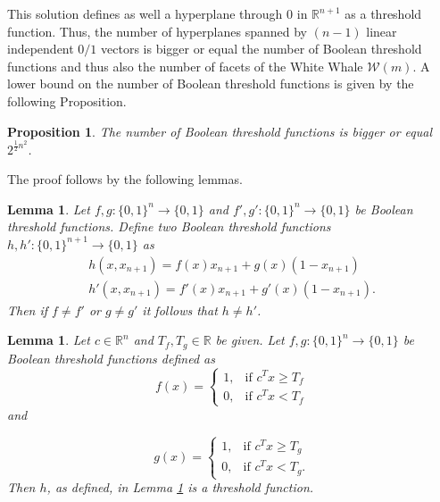 \documentclass[11pt]{amsart}
\newtheorem{prop}[theorem]{Proposition}
\newtheorem{lem}[theorem]{Lemma}
\theoremstyle{definition}
\theoremstyle{definition}
\theoremstyle{question}
\newcommand\WW{\mathcal{W}}
\begin{document}
This solution defines as well a hyperplane through $0$ in $\mathbb{R}^{n+1}$ as a threshold function.  Thus, the number of hyperplanes spanned by $(n-1)$ linear independent $0/1$ vectors is bigger or equal the number of Boolean threshold functions and thus also the number of facets of the White Whale $\WW(m)$. A lower bound on the number of Boolean threshold functions is given by the following Proposition. 

\begin{prop}
The number of Boolean threshold functions is bigger or equal $2^{\frac{1}{2}n^2}$. 
\end{prop}

The proof follows by the following lemmas.

\begin{lem} \label{lem1}
Let $f,g \colon \{0,1 \}^n \rightarrow \{0,1 \}$ and $f',g' \colon \{0,1 \}^n \rightarrow \{0,1 \}$ be Boolean threshold functions. Define two Boolean threshold functions $h,h' \colon \{0,1 \}^{n+1} \rightarrow \{0,1 \}$ as 
\begin{align*}
    h(x,x_{n+1}) = f(x)x_{n+1} + g(x)(1-x_{n+1}) \\
    h'(x,x_{n+1}) = f'(x)x_{n+1} + g'(x)(1-x_{n+1}).
\end{align*}
Then if $f\neq f' $ or $g \neq g'$ it follows that $h \neq h'$. 
\end{lem}

\begin{lem} \label{lem2}
Let $c \in \mathbb{R}^n$ and $T_f,T_g \in \mathbb{R}$ be given. 
Let $f,g \colon \{0,1 \}^n \rightarrow \{0,1 \}$ be Boolean threshold functions defined as
\begin{equation*}
  f(x)=\begin{cases}
    1, & \text{if $c^Tx \geq T_f$}\\
    0, & \text{if $c^Tx < T_f$}
  \end{cases}
\end{equation*} and 

\begin{equation*}
  g(x)=\begin{cases}
    1, & \text{if $c^Tx \geq T_g$}\\
    0, & \text{if $c^Tx < T_g$}.
  \end{cases}
\end{equation*}
Then $h$, as defined, in Lemma \ref{lem1} is a threshold function.

\end{lem}
\end{document}
